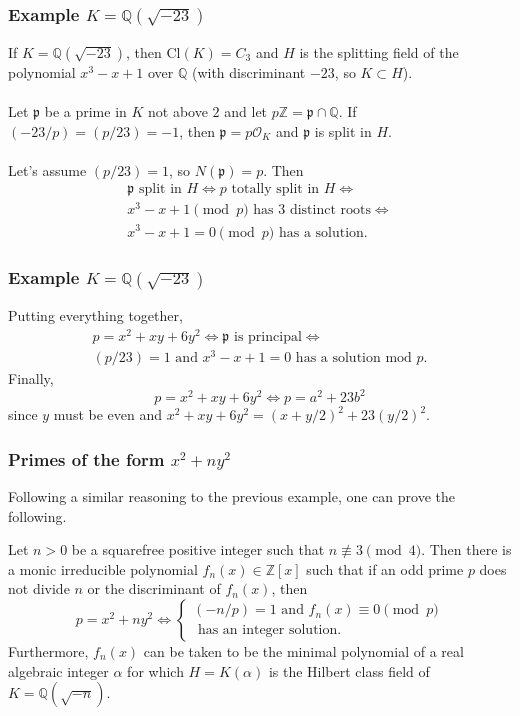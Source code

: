 \documentclass{beamer}
\newcommand{\Cl}{\mathrm{Cl}}
\newcommand{\QQ}{\mathbb{Q}}
\newcommand{\ZZ}{\mathbb{Z}}
\newcommand{\pp}{\mathfrak{p}}
\theoremstyle{plain}
\begin{document}
\begin{frame}[fragile]
    \frametitle{Example $K=\QQ(\sqrt{-23})$}
    If $K=\QQ(\sqrt{-23})$, then $\Cl(K)=C_3$ and $H$ is the splitting field of the polynomial $x^3-x+1$ over $\QQ$ (with discriminant $-23$, so $K\subset H$). 
    \\~\\
    Let $\pp$ be a prime in $K$ not above $2$ and let $p\ZZ=\pp\cap\QQ$. If $(-23/p)=(p/23)=-1$, then $\pp=p\mathcal{O}_K$ and $\pp$ is split in $H$.
    \\~\\
    Let's assume $(p/23)=1$, so $N(\pp)=p$. Then
    \begin{align*}
        \pp \text{ split in }H\iff p\text{ totally split in }H\iff \\
        x^3-x+1\pmod{p}\text{ has 3 distinct roots}\iff\\
        x^3-x+1=0\pmod{p}\text{ has a solution.}
    \end{align*} 


\end{frame}


\begin{frame}
    \frametitle{Example $K=\QQ(\sqrt{-23})$}
    Putting everything together, 
    \begin{align*}
        p=x^2+xy+6y^2\iff \pp\text{ is principal}\iff\\
        \text{$(p/23)=1$ and $x^3-x+1=0$ has a solution mod $p$}.
    \end{align*}
    Finally, 
    $$p=x^2+xy+6y^2\iff p=a^2+23b^2$$
    since $y$ must be even and $x^2+xy+6y^2=(x+y/2)^2+23(y/2)^2$.
\end{frame}

\begin{frame}
    \frametitle{Primes of the form $x^2+ny^2$}
    Following a similar reasoning to the previous example, one can prove the following.
    \begin{theorem}
        Let $n>0$ be a squarefree positive integer such that $n\not\equiv3\pmod{4}$. Then there is a monic irreducible polynomial $f_n(x)\in\ZZ[x]$ such that if an odd prime $p$ does not divide $n$ or the discriminant of $f_n(x)$, then 
        \[
        p=x^2+ny^2\iff
        \begin{cases}
            (-n/p)=1 \text{ and }f_n(x)\equiv0\pmod{p}\\
            \text{ has an integer solution.}
        \end{cases}    
        \]     
        Furthermore, $f_n(x)$ can be taken to be the minimal polynomial of a real algebraic integer $\alpha$ for which $H=K(\alpha)$ is the Hilbert class field of $K=\QQ(\sqrt{-n})$. 
    \end{theorem}
\end{frame}
\end{document}
